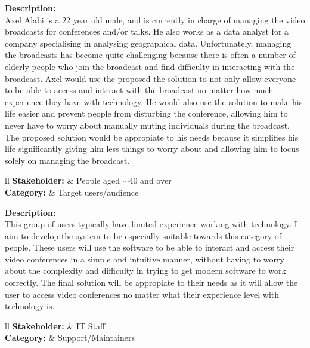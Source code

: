 \textbf{Description:} \\ 

Axel Alabi is a $22$ year old male, and is currently in charge 
of managing the video broadcasts for conferences and/or talks.
He also works as a data analyst for a company specialising in
analysing geographical data. Unfortunately, managing the
broadcasts has become quite challenging because there is
often a number of elderly people who join the broadcast and
find difficulty in interacting with the broadcast. Axel would 
use the proposed the solution to not only allow everyone to be
able to access and interact with the broadcast no matter how 
much experience they have with technology. He would also use 
the solution to make his life easier and prevent people from 
disturbing the conference, allowing him to never have to worry
about manually muting individuals during the broadcast. The 
proposed solution would be appropiate to his needs because it 
simplifies his life significantly giving him less things to 
worry about and allowing him to focus solely on managing the 
broadcast. \vspace{0.2cm}

\noindent
\begin{tblr}{ll}
  \textbf{Stakeholder: } & People aged $\sim 40$ and over\\
  \textbf{Category: } & Target users/audience\\
\end{tblr}
\vspace{0.2cm}

\textbf{Description: } \\

This group of users typically have limited experience working 
with technology. I aim to develop the system to be especially
suitable towards this category of people. These users will use
the software to be able to interact and access their video 
conferences in a simple and intuitive manner, without having 
to worry about the complexity and difficulty in trying to get
modern software to work correctly. The final solution will be
appropiate to their needs as it will allow the user to access
video conferences no matter what their experience level with 
technology is.\vspace{0.2cm}

\noindent
\begin{tblr}{ll}
  \textbf{Stakeholder: } & IT Staff\\
  \textbf{Category: } & Support/Maintainers\\
\end{tblr}
\vspace{0.2cm}

